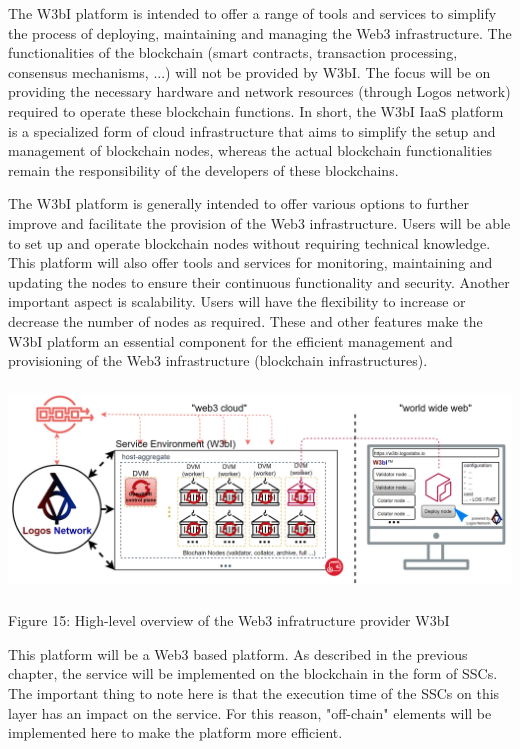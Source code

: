 \documentclass[]{article}
\begin{document}
The W3bI platform is intended to offer a range of tools and services to simplify the process of deploying, maintaining and managing the Web3 infrastructure.
The functionalities of the blockchain (smart contracts, transaction processing, consensus mechanisms, ...) will not be provided by W3bI.   
The focus will be on providing the necessary hardware and network resources (through Logos network) required to operate these blockchain functions.
In short, the W3bI IaaS platform is a specialized form of cloud infrastructure that aims to simplify the setup and management of blockchain nodes, whereas the actual blockchain functionalities remain the responsibility of the developers of these blockchains.

The W3bI platform is generally intended to offer various options to further improve and facilitate the provision of the Web3 infrastructure.
Users will be able to set up and operate blockchain nodes without requiring technical knowledge. 
This platform will also offer tools and services for monitoring, maintaining and updating the nodes to ensure their continuous functionality and security. 
Another important aspect is scalability. 
Users will have the flexibility to increase or decrease the number of nodes as required.
These and other features make the W3bI platform an essential component for the efficient management and provisioning of the Web3 infrastructure (blockchain infrastructures).

\begin{center}
	\includegraphics[height=5.5cm]{w3bi-overview}
\end{center}
\begin{center}
	Figure 15: High-level overview of the Web3 infratructure provider W3bI
\end{center}

This platform will be a Web3 based platform.
As described in the previous chapter, the service will be implemented on the blockchain in the form of SSCs. 
The important thing to note here is that the execution time of the SSCs on this layer has an impact on the service. 
For this reason, "off-chain" elements will be implemented here to make the platform more efficient. 
\end{document}
